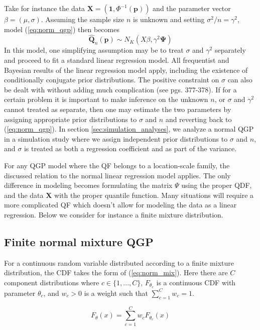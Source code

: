 \documentclass[preprint,12pt,authoryear]{elsarticle}
\newcommand{\1}[1]{\mathds{1}\left[#1\right]}
\begin{document}
Take for instance the data 
$\boldsymbol{X} = \left(\textbf{1}, \Phi^{-1}(\boldsymbol{p})\right)$ and the 
parameter vector $\beta = (\mu, \sigma)$. Assuming the sample size $n$ is 
unknown and setting $\sigma^2/n = \gamma^2$, model (\ref{eq:norm_qgp}) then 
becomes
\[
    \hat{\boldsymbol{Q}}_n(\boldsymbol{p}) \sim N_K\left(X\beta, 
\gamma^2 \boldsymbol{\Psi}\right)
\]
In this model, one simplifying assumption may be to treat $\sigma$ and 
$\gamma^2$ separately and proceed to fit a standard linear regression model. 
All frequentist and Bayesian results of the linear regression model apply, 
including the existence of conditionally conjugate prior distributions. The 
positive constraint on $\sigma$ can also be dealt with without adding much 
complication (see \cite{gelman2013bayesian} pgs. 377-378). If for a certain 
problem it is important to make inference on the unknown $n$, or $\sigma$ and 
$\gamma^2$ cannot treated as separate, then one may estimate the two parameters 
by assigning appropriate prior distributions to $\sigma$ and $n$ and reverting 
back to (\ref{eq:norm_qgp}). In section \ref{sec:simulation_analyses}, we 
analyze a normal QGP in a simulation study where we assign independent prior 
distributions to $\sigma$ and $n$, and $\sigma$ is treated as both a regression 
coefficient and as part of the variance.



For any QGP model where the QF belongs to a location-scale family, the 
discussed relation to the normal linear regression model applies. The only 
difference in modeling becomes formulating the matrix $\Psi$ using the proper 
QDF, and the data $\boldsymbol{X}$ with the proper quantile function. Many 
situations will require a more complicated QF which doesn't allow for modeling 
the data as a linear regression. Below we consider for instance a finite 
mixture distribution. 

\subsection{Finite normal mixture QGP}

For a continuous random variable distributed according to a finite mixture 
distribution, the CDF takes the form of (\ref{eq:norm_mix}). Here there are $C$ 
component distributions where $c \in \{1, ..., C\}$, $F_{\theta_c}$ is a 
continuous CDF with parameter $\theta_c$, and $w_c > 0$ is a weight such that 
$\sum_{c = 1}^C w_c = 1$. 

\begin{equation}
    \label{eq:norm_mix}
    F_{\theta}(x) = \sum_{c = 1}^C w_c F_{\theta_c}(x)
\end{equation}
\end{document}

